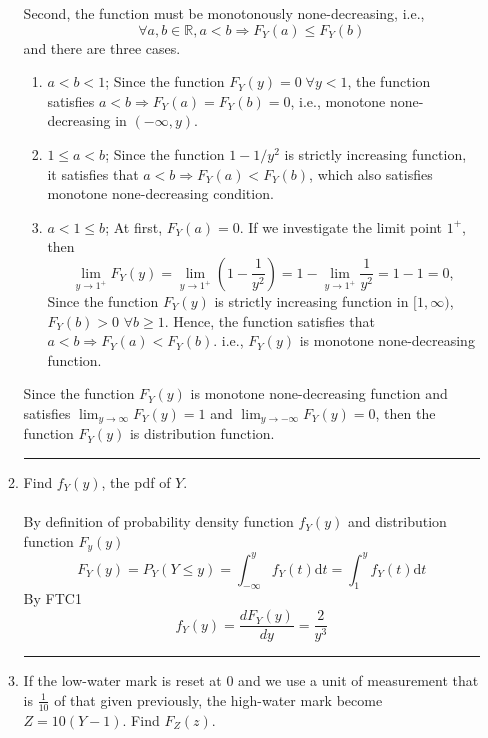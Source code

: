 \documentclass[twoside]{article}
\theoremstyle{definition}
\theoremstyle{remark}
\newenvironment{sol}{{\bf Solution:}}{\hfill\rule{2mm}{2mm}}
\begin{document}
\begin{enumerate}
\begin{enumerate}
\begin{sol}
      Second, the function must be monotonously none-decreasing, i.e.,
      \begin{equation}
        \forall a, b \in \mathbb{R}, a < b \Rightarrow F_Y(a) \leq F_Y(b)
      \end{equation}
      and there are three cases.
      \begin{enumerate}
        \item $a < b < 1$; Since the function $F_Y(y) = 0\;\forall y < 1$, the
        function satisfies $a < b \Rightarrow F_Y(a) = F_Y(b) = 0$, i.e., monotone
        none-decreasing in $(-\infty, y)$.
        \item $1 \leq a < b$; Since the function $1 - 1/y^2$ is strictly increasing
        function, it satisfies that $a < b \Rightarrow F_Y(a) < F_Y(b)$, which
        also satisfies monotone none-decreasing condition.
        \item $a < 1 \leq b$; At first, $F_Y(a) = 0$. If we investigate the limit
        point $1^+$, then
        \begin{equation}
          \lim_{y \rightarrow 1^{+}} F_Y(y)
          = \lim_{y \rightarrow 1^{+}} \left( 1 - \frac{1}{y^2} \right)
          = 1 - \lim_{y \rightarrow 1^{+}} \frac{1}{y^2}
          = 1 - 1 = 0,
        \end{equation}
        Since the function $F_Y(y)$ is strictly increasing function in $[1, \infty)$,
        $F_Y(b) > 0$ $\forall b \geq 1$. Hence, the function satisfies that
        $a < b \Rightarrow F_Y(a) < F_Y(b)$. i.e., $F_Y(y)$ is monotone none-decreasing
        function.
      \end{enumerate}
      Since the function $F_Y(y)$ is monotone none-decreasing function and satisfies
      $\lim_{y \rightarrow \infty} F_Y(y) = 1$ and $\lim_{y \rightarrow -\infty} F_Y(y) = 0$,
      then the function $F_Y(y)$ is distribution function.
    \end{sol}
    \item Find $f_Y(y)$, the pdf of $Y$. \\
    \begin{sol} \\
      By definition of probability density function $f_Y(y)$ and distribution
      function $F_y(y)$
      \begin{equation}
        F_Y(y) = P_Y(Y \leq y)
        = \int_{-\infty}^{y} f_Y(t) \mathrm{d}t
        = \int_{1}^{y} f_Y(t) \mathrm{d}t
      \end{equation}
      By FTC1
      \begin{equation}
        f_Y(y) = \frac{d F_Y(y)}{dy} = \frac{2}{y^3}
      \end{equation}
    \end{sol}
    \item If the low-water mark is reset at $0$ and we use a unit of measurement that
    is $\frac{1}{10}$ of that given previously, the high-water mark become $Z =
    10 (Y - 1)$. Find $F_Z(z)$.


\end{enumerate}
\end{enumerate}
\end{document}
